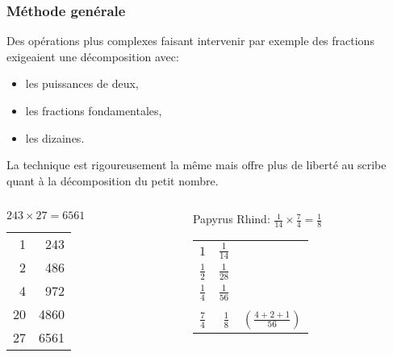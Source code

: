 \begin{frame}
\frametitle{Méthode genérale}

Des opérations plus complexes faisant intervenir par exemple des fractions exigeaient une décomposition avec:
\begin{itemize}
\item  les puissances de deux,
\item les fractions fondamentales,
\item les dizaines. 
\end{itemize}
La technique est rigoureusement la même mais offre plus de liberté au scribe quant à la décomposition du petit nombre.
\begin{columns}
\begin{column}[t]{0.48\textwidth}
  \begin{exampleblock}{$243\times27 = 6561$}
    \begin{tabular}{r|r}
      1 & 243 \\
      2 & 486 \\
      4 & 972 \\
      20 & 4860 \\ \hline
      27 & 6561
      \end{tabular}    
  \end{exampleblock}
\end{column}

\begin{column}[t]{0.48\textwidth}
  \begin{exampleblock}{Papyrus Rhind: $\frac{1}{14} \times \frac{7}{4} = \frac{1}{8}$}
    \begin{tabular}{r|rl}
      $1$ & $\frac{1}{14}$& \\[3pt]
      $\frac{1}{2}$ & $\frac{1}{28}$& \\[3pt]
      $\frac{1}{4}$ & $\frac{1}{56}$& \\[3pt] \cline{1-2} \\[-1.0em] 
      $\frac{7}{4}$ & $\frac{1}{8}$& $(\frac{4+2+1}{56})$ 
    \end{tabular}
  \end{exampleblock}
\end{column}
\end{columns}

\end{frame}


